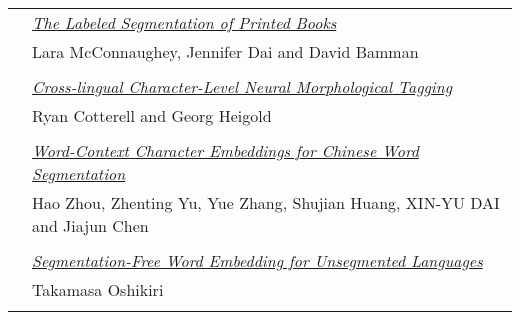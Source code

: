 \begin{tabular}{p{20mm}p{128mm}}
 & \hyperlink{page.746}{\em The Labeled Segmentation of Printed Books}\\
         & Lara McConnaughey, Jennifer Dai and David Bamman \\
\\

 & \hyperlink{page.757}{\em Cross-lingual Character-Level Neural Morphological Tagging}\\
         & Ryan Cotterell and Georg Heigold \\
\\

 & \hyperlink{page.769}{\em Word-Context Character Embeddings for Chinese Word Segmentation}\\
         & Hao Zhou, Zhenting Yu, Yue Zhang, Shujian Huang, XIN-YU DAI and Jiajun Chen \\
\\

 & \hyperlink{page.776}{\em Segmentation-Free Word Embedding for Unsegmented Languages}\\
         & Takamasa Oshikiri \\
\\

\end{tabular}
\newpage
